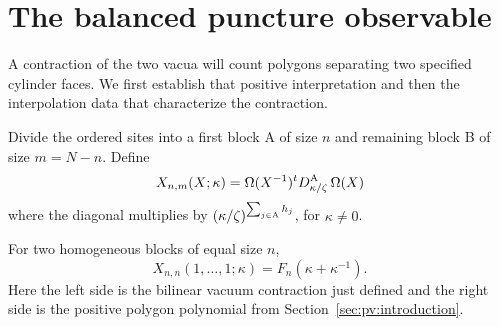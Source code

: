 \section{The balanced puncture observable}\label{c01-c1-the-balanced-puncture-observable}

A contraction of the two vacua will count polygons separating two specified cylinder faces. We first establish that positive interpretation and then the interpolation data that characterize the contraction.

Divide the ordered sites into a first block A of size \(n\) and remaining block B of size \(m=N-n\). Define
\[
 X_{n,m}(X;\kappa)=\Omega(X^{-1})^t D_{\kappa/\zeta}^{\rm A}\,\Omega(X)
\]
where the diagonal multiplies by \((\kappa/\zeta)^{\sum_{j\in{\rm A}}h_j}\), for \(\kappa\ne0\).
\begin{samepage}
\begin{proposition}\label{prop:pv:physical-pairing}
For two homogeneous blocks of equal size $n$,
\[
 X_{n,n}(1,\ldots,1;\kappa)=F_n(\kappa+\kappa^{-1}).
\]
Here the left side is the bilinear vacuum contraction just defined and the right side is the positive polygon polynomial from Section~\ref{sec:pv:introduction}.
\end{proposition}
\end{samepage}

